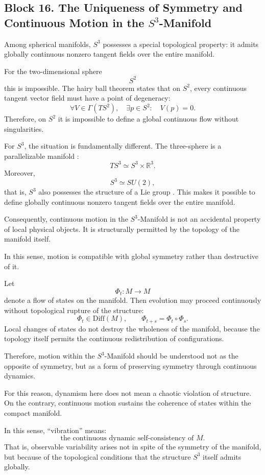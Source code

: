 \documentclass[12pt,a4paper]{article}
\theoremstyle{definition}
\begin{document}
\subsection{Block 16. The Uniqueness of Symmetry and Continuous Motion in the \(S^3\)-Manifold}
Among spherical manifolds, \(S^3\) possesses a special topological property: it admits globally continuous nonzero tangent fields over the entire manifold.

For the two-dimensional sphere
\[
S^2
\]
this is impossible. The hairy ball theorem \cite{Milnor1956} states that on \(S^2\), every continuous tangent vector field must have a point of degeneracy:
\[
\forall V\in \Gamma(TS^2),
\quad
\exists p\in S^2:
\quad
V(p)=0.
\]
Therefore, on \(S^2\) it is impossible to define a global continuous flow without singularities.

For \(S^3\), the situation is fundamentally different. The three-sphere is a parallelizable manifold \cite{Hatcher2002}:
\[
TS^3\simeq S^3\times \mathbb R^3.
\]
Moreover,
\[
S^3\simeq SU(2),
\]
that is, \(S^3\) also possesses the structure of a Lie group \cite{Thurston1997}. This makes it possible to define globally continuous nonzero tangent fields over the entire manifold.

Consequently, continuous motion in the \(S^3\)-Manifold is not an accidental property of local physical objects. It is structurally permitted by the topology of the manifold itself.

In this sense, motion is compatible with global symmetry rather than destructive of it.

Let
\[
\Phi_t:M\to M
\]
denote a flow of states on the manifold. Then evolution may proceed continuously without topological rupture of the structure:
\[
\Phi_t\in \mathrm{Diff}(M),
\qquad
\Phi_{t+s}=\Phi_t\circ\Phi_s.
\]
Local changes of states do not destroy the wholeness of the manifold, because the topology itself permits the continuous redistribution of configurations.

Therefore, motion within the \(S^3\)-Manifold should be understood not as the opposite of symmetry, but as a form of preserving symmetry through continuous dynamics.

For this reason, dynamism here does not mean a chaotic violation of structure. On the contrary, continuous motion sustains the coherence of states within the compact manifold.

In this sense, ``vibration'' means:
\[
\text{the continuous dynamic self-consistency of } M.
\]
That is, observable variability arises not in spite of the symmetry of the manifold, but because of the topological conditions that the structure \(S^3\) itself admits globally.
\end{document}
